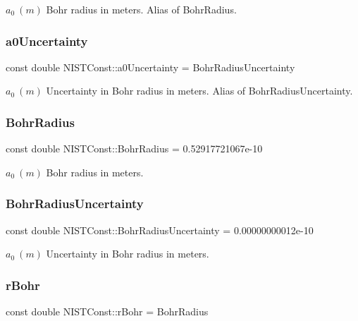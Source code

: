 $a_0 \ (m)$ Bohr radius in meters. Alias of Bohr\+Radius. \mbox{\label{group___n_i_s_t_const-_bohr_radius_ga69cffcfd4d8bdc8525818d56ac079b8d}} 
\subsubsection{\texorpdfstring{a0\+Uncertainty}{a0Uncertainty}}
{\footnotesize\ttfamily const double N\+I\+S\+T\+Const\+::a0\+Uncertainty = Bohr\+Radius\+Uncertainty}

$a_0 \ (m)$ Uncertainty in Bohr radius in meters. Alias of Bohr\+Radius\+Uncertainty. \mbox{\label{group___n_i_s_t_const-_bohr_radius_ga38bdb86c2f3e484e8b164e75a3980638}} 
\subsubsection{\texorpdfstring{Bohr\+Radius}{BohrRadius}}
{\footnotesize\ttfamily const double N\+I\+S\+T\+Const\+::\+Bohr\+Radius = 0.\+52917721067e-\/10}

$a_0 \ (m)$ Bohr radius in meters. \mbox{\label{group___n_i_s_t_const-_bohr_radius_gad031da8c7a2e239441e06c10fd8f6f07}} 
\subsubsection{\texorpdfstring{Bohr\+Radius\+Uncertainty}{BohrRadiusUncertainty}}
{\footnotesize\ttfamily const double N\+I\+S\+T\+Const\+::\+Bohr\+Radius\+Uncertainty = 0.\+00000000012e-\/10}

$a_0 \ (m)$ Uncertainty in Bohr radius in meters. \mbox{\label{group___n_i_s_t_const-_bohr_radius_gad2a74a106c13086263e42411835b6352}} 
\subsubsection{\texorpdfstring{r\+Bohr}{rBohr}}
{\footnotesize\ttfamily const double N\+I\+S\+T\+Const\+::r\+Bohr = Bohr\+Radius}

